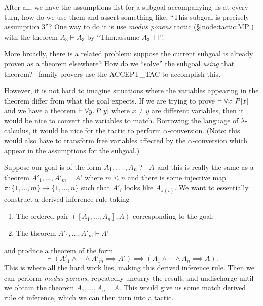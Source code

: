 \begin{node}
After all, we have the assumptions list for a subgoal accompanying us
at every turn, how do we use them and assert something like, ``This subgoal is precisely assumption 3''?
One way to do it is use \textit{modus ponens} tactic (\S\ref{node:tactic:MP})
with the theorem $A_{3}\vdash A_{3}$ by ``{\Tt{}Thm.assume\nwendquote} $A_{3}$ \texttt{[]}''.
\end{node}

\begin{node}
More broadly, there is a related problem: suppose the current subgoal
is already proven as a theorem elsewhere? How do we ``solve'' the
subgoal \emph{using} that theorem? \HOL\ family provers use the
{\Tt{}ACCEPT{\_}TAC\nwendquote} to accomplish this.

However, it is not hard to imagine situations where the variables
appearing in the theorem differ from what the goal expects. If we are
trying to prove $\vdash\forall x\ldotp P[x]$ and we have a theorem
$\vdash\forall y\ldotp P[y]$ where $x\neq y$ are different variables,
then it would be nice to convert the variables to match. Borrowing the
language of $\lambda$-calculus, it would be nice for the tactic to
perform $\alpha$-conversion. (Note: this would also have to transform
free variables affected by the $\alpha$-conversion which appear in the
assumptions for the subgoal.)
\end{node}

\begin{node}
Suppose our goal is of the form $A_{1},\dots,A_{n}\mathrel{?\!-} A$ and this
is really the same as a theorem $A'_{1},\dots,A'_{m}\vdash A'$ where
$m\leq n$ and there is some injective map $\pi\colon\{1,\dots,m\}\to\{1,\dots,n\}$
such that $A'_{i}$ looks like $A_{\pi(i)}$. We want to essentially
construct a derived inference rule taking
\begin{enumerate}
\item The ordered pair $([A_{1},\dots,A_{n}], A)$ corresponding to the goal;
\item The theorem $A'_{1},\dots,A'_{m}\vdash A'$
\end{enumerate}
and produce a theorem of the form
\begin{equation*}
\vdash(A'_{1}\land\cdots\land A'_{m}\implies A')\implies(A_{1}\land\cdots\land A_{n}\implies A).
\end{equation*}
This is where all the hard work lies, making this derived inference
rule. Then we can perform \textit{modus ponens}, repeatedly uncurry
the result, and undischarge until we obtain the theorem $A_{1},\dots,A_{n}\vdash A$.
This would give us some {\Tt{}match\nwendquote} derived rule of inference, which we
can then turn into a tactic.
\end{node}

